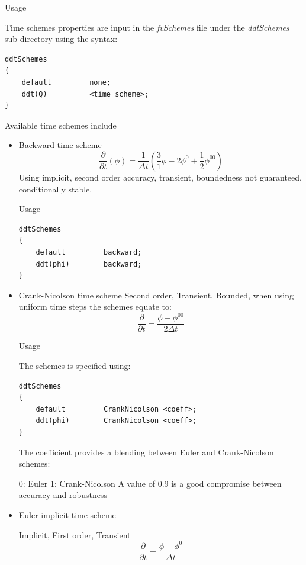 \documentclass{article}
\begin{document}
Usage 

Time schemes properties are input in the \textit{fvSchemes} file under the \textit{ddtSchemes} sub-directory using the syntax:

\begin{verbatim}
ddtSchemes
{
    default         none;
    ddt(Q)          <time scheme>;
}
\end{verbatim}
 
Available time schemes include
\begin{itemize}
\item Backward time scheme
\begin{equation}
\frac{\partial}{\partial t}(\phi) = \frac{1}{\Delta t}(\frac{3}{1}\phi - 2\phi^0 + \frac{1}{2} \phi^{00})
\end{equation}
Using implicit, second order accuracy, transient, boundedness not guaranteed, conditionally stable. 

Usage 

\begin{verbatim}
ddtSchemes
{
    default         backward;
    ddt(phi)        backward;
}
\end{verbatim}

\item Crank-Nicolson time scheme
Second order, Transient, Bounded, when using uniform time steps the schemes equate to: 
\begin{equation}
\frac{\partial}{\partial t} = \frac{\phi - \phi^{00}}{2\Delta t}
\end{equation}

Usage

The schemes is specified using: 

\begin{verbatim}
ddtSchemes
{
    default         CrankNicolson <coeff>;
    ddt(phi)        CrankNicolson <coeff>;
}
\end{verbatim}

The coefficient provides a blending between Euler and Crank-Nicolson schemes:

0: Euler
1: Crank-Nicolson
A value of 0.9 is a good compromise between accuracy and robustness

\item Euler implicit time scheme

Implicit, First order, Transient 
\begin{equation}
\frac{\partial}{\partial t} = \frac{\phi - \phi^0}{\Delta t}
\end{equation}


\end{itemize}
\end{document}
